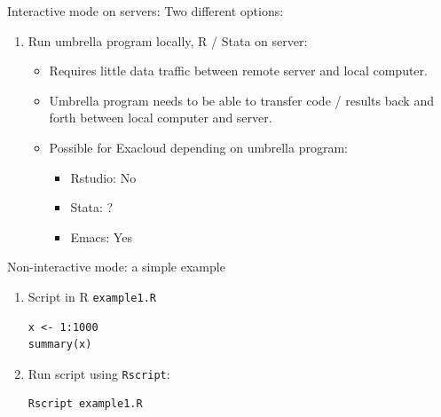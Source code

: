 \documentclass[12pt,t,xcolor=table]{beamer}
\begin{document}
\begin{frame}[label={sec:orgheadline12}]{Interactive mode on servers:}
Two different options:

\begin{enumerate}
\item Run umbrella program locally, R / Stata on server:

\begin{itemize}
\item Requires little data traffic between remote server and local computer.

\item Umbrella program needs to be able to transfer code / results back and forth between local computer and server.

\item Possible for Exacloud depending on umbrella program:

\begin{itemize}
\item Rstudio: No

\item Stata: ?

\item Emacs: Yes
\end{itemize}
\end{itemize}
\end{enumerate}
\end{frame}

\begin{frame}[fragile,label={sec:orgheadline13}]{Non-interactive mode: a simple example}
 \begin{enumerate}
\item Script in R \texttt{example1.R}

\begin{verbatim}
x <- 1:1000
summary(x)
\end{verbatim}

\item Run script using \texttt{Rscript}: 

\begin{verbatim}
Rscript example1.R
\end{verbatim}
\end{enumerate}
\end{frame}
\end{document}
